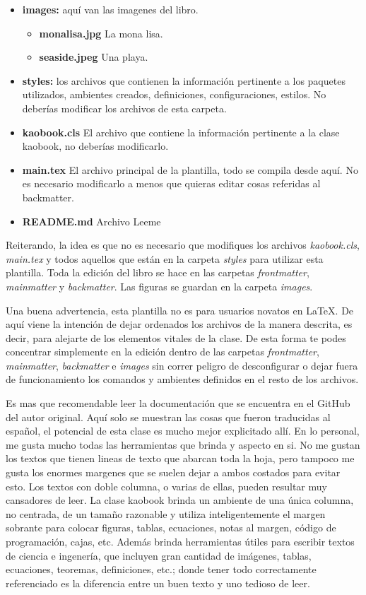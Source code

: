 \begin{itemize}
\begin{itemize}
    \end{itemize}
    \item \textbf{images:} aquí van las imagenes del libro.
    \begin{itemize}
        \item \textbf{monalisa.jpg} La mona lisa.
        \item \textbf{seaside.jpeg} Una playa.  
    \end{itemize}
    \item \textbf{styles:} los archivos que contienen la información pertinente a los paquetes utilizados, ambientes creados, definiciones, configuraciones, estilos. No deberías modificar los archivos de esta carpeta.
    \item \textbf{kaobook.cls} El archivo que contiene la información pertinente a la clase kaobook, no deberías modificarlo.
    \item \textbf{main.tex} El archivo principal de la plantilla, todo se compila desde aquí. No es necesario modificarlo a menos que quieras editar cosas referidas al backmatter.
    \item \textbf{README.md} Archivo Leeme
\end{itemize}

Reiterando, la idea es que no es necesario que modifiques los archivos \emph{kaobook.cls}, \emph{main.tex} y todos aquellos que están en la carpeta \emph{styles} para utilizar esta plantilla. Toda la edición del libro se hace en las carpetas \emph{frontmatter}, \emph{mainmatter} y \emph{backmatter}. Las figuras se guardan en la carpeta \emph{images}. 

Una buena advertencia, esta plantilla no es para usuarios novatos en \LaTeX. De aquí viene la intención de dejar ordenados los archivos de la manera descrita, es decir, para alejarte de los elementos vitales de la clase. De esta forma te podes concentrar simplemente en la edición dentro de las carpetas \emph{frontmatter}, \emph{mainmatter}, \emph{backmatter} e \emph{images} sin correr peligro de desconfigurar o dejar fuera de funcionamiento los comandos y ambientes definidos en el resto de los archivos.

Es mas que recomendable leer la documentación que se encuentra en el GitHub del autor original. Aquí solo se muestran las cosas que fueron traducidas al español, el potencial de esta clase es mucho mejor explicitado allí. En lo personal, me gusta mucho todas las herramientas que brinda y aspecto en si. No me gustan los textos que tienen lineas de texto que abarcan toda la hoja, pero tampoco me gusta los enormes margenes que se suelen dejar a ambos costados para evitar esto. Los textos con doble columna, o varias de ellas, pueden resultar muy cansadores de leer. La clase kaobook brinda un ambiente de una única columna, no centrada, de un tamaño razonable y utiliza inteligentemente el margen sobrante para colocar figuras, tablas, ecuaciones, notas al margen, código de programación, cajas, etc. Además brinda herramientas útiles para escribir textos de ciencia e ingenería, que incluyen gran cantidad de imágenes, tablas, ecuaciones, teoremas, definiciones, etc.; donde tener todo correctamente referenciado es la diferencia entre un buen texto y uno tedioso de leer.

